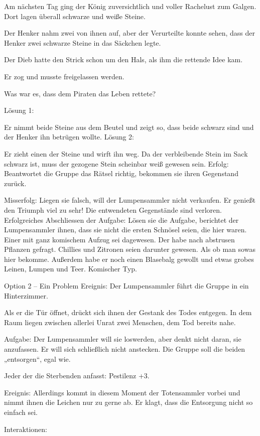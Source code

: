 Am nächsten Tag ging der König zuversichtlich und voller Rachelust zum Galgen. Dort lagen überall schwarze und weiße Steine.

Der Henker nahm zwei von ihnen auf, aber der Verurteilte konnte sehen, dass der Henker zwei schwarze Steine in das Säckchen legte.

Der Dieb hatte den Strick schon um den Hals, als ihm die rettende Idee kam.

Er zog und musste freigelassen werden.

Was war es, dass dem Piraten das Leben rettete?


Lösung 1:

Er nimmt beide Steine aus dem Beutel und zeigt so, dass beide schwarz sind und der Henker ihn betrügen wollte.
Lösung 2:

Er zieht einen der Steine und wirft ihn weg. Da der verbleibende Stein im Sack schwarz ist, muss der gezogene Stein scheinbar weiß gewesen sein.
Erfolg: Beantwortet die Gruppe das Rätsel richtig, bekommen sie ihren Gegenstand zurück.

Misserfolg: Liegen sie falsch, will der Lumpensammler nicht verkaufen. Er genießt den Triumph viel zu sehr! Die entwendeten Gegenstände sind verloren.
Erfolgreiches Abschliessen der Aufgabe: Lösen sie die Aufgabe, berichtet der Lumpensammler ihnen, dass sie nicht die ersten Schnösel seien, die hier waren. Einer mit ganz komischem Aufzug sei dagewesen. Der habe nach abstrusen Pflanzen gefragt. Chillies und Zitronen seien darunter gewesen. Als ob man sowas hier bekomme. Außerdem habe er noch einen Blasebalg gewollt und etwas grobes Leinen, Lumpen und Teer. Komischer Typ.


Option 2 – Ein Problem
Ereignis: Der Lumpensammler führt die Gruppe in ein Hinterzimmer.

Als er die Tür öffnet, drückt sich ihnen der Gestank des Todes entgegen. In dem Raum liegen zwischen allerlei Unrat zwei Menschen, dem Tod bereits nahe.

Aufgabe: Der Lumpensammler will sie loswerden, aber denkt nicht daran, sie anzufassen. Er will sich schließlich nicht anstecken. Die Gruppe soll die beiden „entsorgen“, egal wie.

Jeder der die Sterbenden anfasst: Pestilenz +3.

Ereignis: Allerdings kommt in diesem Moment der Totensammler vorbei und nimmt ihnen die Leichen nur zu gerne ab. Er klagt, dass die Entsorgung nicht so einfach sei.

Interaktionen:

